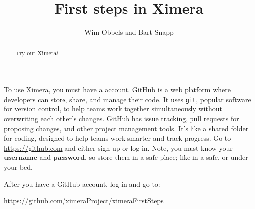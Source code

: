 \documentclass{ximera}
\author{Wim Obbels and Bart Snapp}
\title{First steps in Ximera}
\begin{document}
        \begin{abstract}
            Try out Ximera!
        \end{abstract}
        \maketitle

        To use Ximera, you must have a 
        account.
        GitHub is a web platform where developers can store, share, and
        manage
        their code. It uses \verb!git!, popular software for version control,
        to help
        teams work together simultaneously
        without overwriting each other's changes. GitHub has	issue tracking,
        pull requests for proposing changes, and other project management
        tools. It's
        like a shared folder
        for coding, designed to help teams work smarter and track progress.
        Go to \url{https://github.com} and either sign-up or log-in. Note, you
        must
        know
        your \textbf{username} and \textbf{password}, so store them in a safe
        place; like in a safe, or under your bed.

        After you have a GitHub account, log-in and go to:
        \begin{center}
            \url{https://github.com/ximeraProject/ximeraFirstSteps}
        \end{center}
\end{document}
